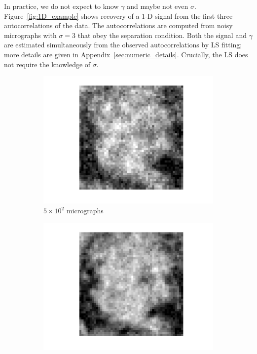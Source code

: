 \documentclass[9pt,twocolumn,twoside,lineno]{pnas-new}
\begin{document}
In practice, we do not expect to know $\gamma$ and maybe not even $\sigma$.
Figure~\ref{fig:1D_example} shows recovery of a 1-D signal from the first three autocorrelations of the data.
The autocorrelations are computed from noisy micrographs with $\sigma=3$ that obey the separation condition.%
 Both the signal  and $\gamma$ are estimated simultaneously from the observed autocorrelations by LS fitting; more details are given in Appendix~\ref{sec:numeric_details}. Crucially, the LS does not require the knowledge of $\sigma$. 


\begin{figure}[h]
	\centering
	\begin{subfigure}[h]{0.24\textwidth}
		\centering
		\includegraphics[scale=0.35]{Einstien_progress_1}
		\caption{$5\times 10^2$ micrographs}
	\end{subfigure} 
	\begin{subfigure}[h]{0.24\textwidth}
	\centering
	\includegraphics[scale=0.35]{Einstien_progress_10}

\end{subfigure}
\end{figure}
\end{document}
